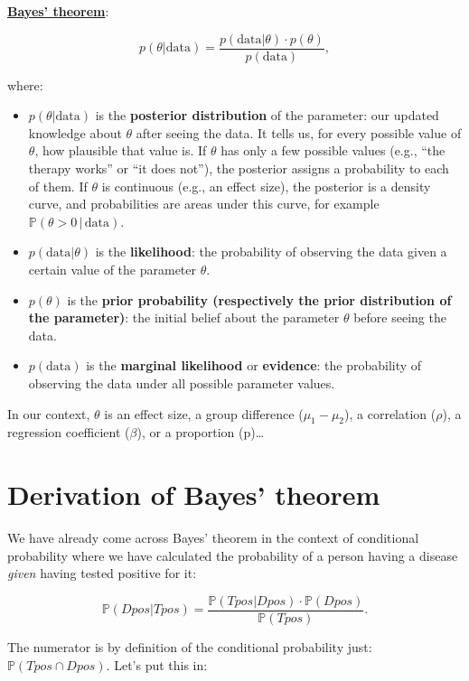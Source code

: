 \documentclass[
]{book}
\begin{document}
\textbf{\href{https://en.wikipedia.org/wiki/Bayes\%27_theorem}{Bayes' theorem}}:

\[
p(\theta | \text{data}) = \frac{p(\text{data} | \theta) \cdot p(\theta)}{p(\text{data})},
\]

where:

\begin{itemize}
\item
  \(p(\theta | \text{data})\) is the \textbf{posterior distribution} of the parameter: our updated knowledge about \(\theta\)
  after seeing the data. It tells us, for every possible value of \(\theta\), how plausible that value is.
  If \(\theta\) has only a few possible values (e.g., ``the therapy works'' or ``it does not''), the posterior assigns
  a probability to each of them. If \(\theta\) is continuous (e.g., an effect size), the posterior is a density curve,
  and probabilities are areas under this curve, for example \(\mathbb{P}(\theta > 0 \,|\, \text{data})\).
\item
  \(p(\text{data} | \theta)\) is the \textbf{likelihood}: the probability of observing the data given a certain value of the parameter \(\theta\).
\item
  \(p(\theta)\) is the \textbf{prior probability (respectively the prior distribution of the parameter)}: the initial belief about the parameter \(\theta\) before seeing the data.
\item
  \(p(\text{data})\) is the \textbf{marginal likelihood} or \textbf{evidence}: the probability of observing the data under all possible parameter values.
\end{itemize}

In our context, \(\theta\) is an effect size, a group difference (\(\mu_1 - \mu_2\)), a correlation (\(\rho\)),
a regression coefficient (\(\beta\)), or a proportion (p)\ldots{}

\section{Derivation of Bayes' theorem}\label{derivation-of-bayes-theorem}

We have already come across Bayes' theorem in the context of conditional probability where we have calculated
the probability of a person having a disease \emph{given} having tested positive for it:

\[
\mathbb{P}(Dpos|Tpos) = \frac{\mathbb{P}(Tpos|Dpos) \cdot \mathbb{P}(Dpos)}{\mathbb{P}(Tpos)}.
\]

The numerator is by definition of the conditional probability just: \(\mathbb{P}(Tpos \cap Dpos)\). Let's put this in:
\end{document}

